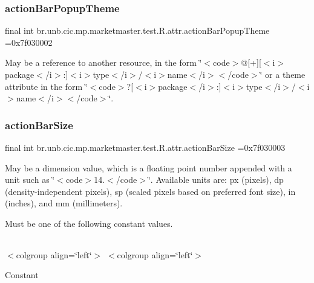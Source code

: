 \subsubsection{\texorpdfstring{action\+Bar\+Popup\+Theme}{actionBarPopupTheme}}
{\footnotesize\ttfamily final int br.\+unb.\+cic.\+mp.\+marketmaster.\+test.\+R.\+attr.\+action\+Bar\+Popup\+Theme =0x7f030002\hspace{0.3cm}{\ttfamily [static]}}

May be a reference to another resource, in the form \char`\"{}$<$code$>$@\mbox{[}+\mbox{]}\mbox{[}$<$i$>$package$<$/i$>$\+:\mbox{]}$<$i$>$type$<$/i$>$/$<$i$>$name$<$/i$>$$<$/code$>$\char`\"{} or a theme attribute in the form \char`\"{}$<$code$>$?\mbox{[}$<$i$>$package$<$/i$>$\+:\mbox{]}$<$i$>$type$<$/i$>$/$<$i$>$name$<$/i$>$$<$/code$>$\char`\"{}. \mbox{\label{classbr_1_1unb_1_1cic_1_1mp_1_1marketmaster_1_1test_1_1R_1_1attr_a6a2aed192f97448ee40e6ee51c759d72}} 
\subsubsection{\texorpdfstring{action\+Bar\+Size}{actionBarSize}}
{\footnotesize\ttfamily final int br.\+unb.\+cic.\+mp.\+marketmaster.\+test.\+R.\+attr.\+action\+Bar\+Size =0x7f030003\hspace{0.3cm}{\ttfamily [static]}}

May be a dimension value, which is a floating point number appended with a unit such as \char`\"{}$<$code$>$14.\+5sp$<$/code$>$\char`\"{}. Available units are\+: px (pixels), dp (density-\/independent pixels), sp (scaled pixels based on preferred font size), in (inches), and mm (millimeters). 

Must be one of the following constant values.

\tabulinesep=1mm
\begin{longtabu} spread 0pt [c]{*{0}{|X[-1]}|}
\hline
\end{longtabu}
$<$colgroup align=\char`\"{}left\char`\"{}$>$ $<$colgroup align=\char`\"{}left\char`\"{}$>$ 

Constant


